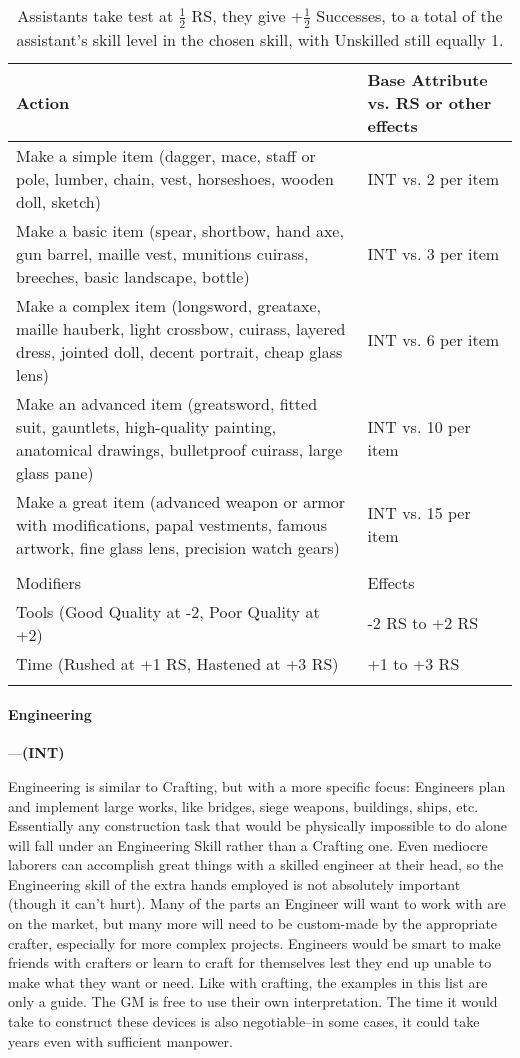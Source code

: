\documentclass[oneside,11pt,english]{book}
\begin{document}
\begin{longtabu} to \linewidth{X[1.5]X[r]}
	\caption{Crafting}
	\label{tab:Crafting}\\
		\rowfont[c]{}Action &Base Attribute vs. RS or other effects\\\toprule
Make a simple item (dagger, mace, staff or pole, lumber, chain, vest, horseshoes, wooden doll, sketch)&INT vs. 2 per item\\
Make a basic item (spear, shortbow, hand axe, gun barrel, maille vest, munitions cuirass, breeches, basic landscape, bottle) &INT vs. 3 per item\\
Make a complex item (longsword, greataxe, maille hauberk, light crossbow, cuirass, layered dress, jointed doll, decent portrait, cheap glass lens) &INT vs. 6 per item\\
Make an advanced item (greatsword, fitted suit, gauntlets, high-quality painting, anatomical drawings, bulletproof cuirass, large glass pane) &INT vs. 10 per item\\
Make a great item (advanced weapon or armor with modifications, papal vestments, famous artwork, fine glass lens, precision watch gears) &INT vs. 15 per item\\
	\\
		\rowfont[c]{}Modifiers & Effects\\\cmidrule(lr){1-2}
Tools (Good Quality at -2, Poor Quality at +2) &-2 RS to +2 RS \\
Time (Rushed at +1 RS, Hastened at +3 RS) &+1 to +3 RS\\
\caption*{Assistants take test at $ \frac{1}{2} $ RS, they give +$ \frac{1}{2} $ Successes, to a total of the assistant’s skill level in the chosen skill, with Unskilled still equally 1.}
\end{longtabu}

\paragraph{\label{skill:Engineering}Engineering}---\quad\textbf{(INT)}\par
Engineering is similar to Crafting, but with a more specific focus: Engineers plan and implement large works, like bridges, siege weapons, buildings, ships, etc. Essentially any construction task that would be physically impossible to do alone will fall under an Engineering Skill rather than a Crafting one. Even mediocre laborers can accomplish great things with a skilled engineer at their head, so the Engineering skill of the extra hands employed is not absolutely important (though it can’t hurt). Many of the parts an Engineer will want to work with are on the market, but many more will need to be custom-made by the appropriate crafter, especially for more complex projects. Engineers would be smart to make friends with crafters or learn to craft for themselves lest they end up unable to make what they want or need. Like with crafting, the examples in this list are only a guide. The GM is free to use their own interpretation. The time it would take to construct these devices is also negotiable--in some cases, it could take years even with sufficient manpower.
\end{document}
